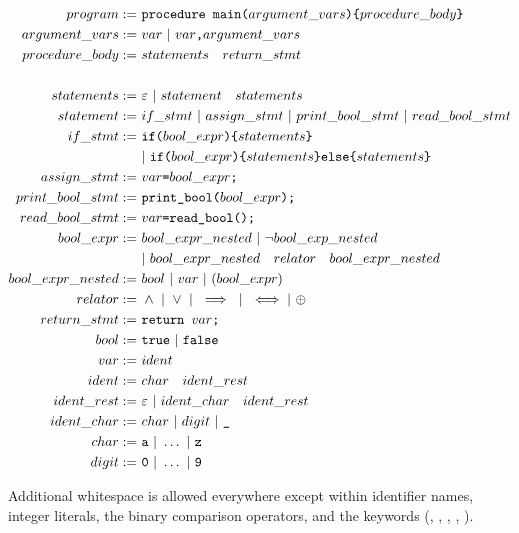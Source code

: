\documentclass{article}
\newcommand\inParens[1]{\texttt{(}#1\texttt{)}}
\newcommand\inBraces[1]{\texttt{\{}#1\texttt{\}}}
\newcommand\comma{\texttt{,}}
\newcommand\semicolon{\texttt{;}}
\begin{document}
\begin{align*}
program :=& \ \texttt{procedure main}\inParens{argument\_vars} \inBraces{procedure\_body} \\
argument\_vars :=& \ var \ | \ var\comma argument\_vars \\
procedure\_body :=& \ statements \quad return\_stmt \\ \\
statements :=& \ \varepsilon \ | \ statement \quad statements \\
statement :=&  \ if\_stmt \ | \ assign\_stmt \ | \ print\_bool\_stmt \ | \ read\_bool\_stmt\\
if\_stmt :=& \ \texttt{if}\inParens{bool\_expr} \inBraces{statements}\\
& \ | \ \texttt{if}\inParens{bool\_expr} \inBraces{statements} \texttt{else}\inBraces{statements} \\
assign\_stmt :=& \ var \texttt{=} bool\_expr \semicolon \\
print\_bool\_stmt :=& \ \texttt{print\_bool}\inParens{bool\_expr}\semicolon \\
read\_bool\_stmt :=& \ var \texttt{=}\texttt{read\_bool}\inParens{}\semicolon \\
bool\_expr :=& \ bool\_expr\_nested \ | \ \neg bool\_exp\_nested \\
& \ | \ bool\_expr\_nested \quad relator \quad bool\_expr\_nested \\
bool\_expr\_nested :=& \ bool \ | \ var \ | \ (bool\_expr) \\
relator :=& \ \land \ | \ \lor \ | \ \implies \ | \ \iff | \ \oplus \\
return\_stmt :=& \ \texttt{return }\space var \semicolon\\
bool :=& \ \texttt{true} \ | \ \texttt{false} \\
var :=& \ ident \\
ident :=& \ char \quad ident\_rest \\
ident\_rest :=& \ \varepsilon \ | \ ident\_char \quad ident\_rest \\
ident\_char :=& \ char \ | \ digit \ | \ \texttt{\_} \\
char :=& \ \texttt{a} \ | \ \ldots \ | \ \texttt{z} \\
digit :=& \ \texttt{0} \ | \ \ldots \ | \ \texttt{9}
\end{align*}

Additional whitespace is allowed everywhere except within identifier names, integer literals, the binary comparison operators, and the keywords (, , , , ).
\end{document}
